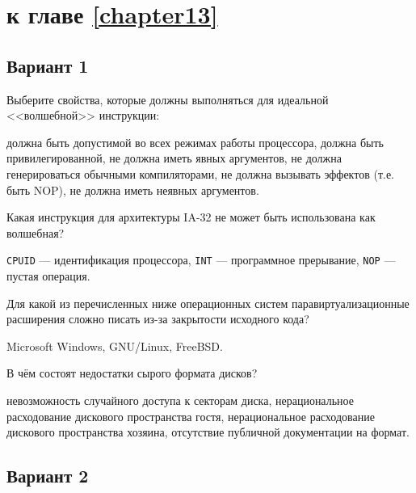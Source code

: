 \section{\Questions к главе \ref{chapter13}} %

\subsection*{Вариант 1}

\begin{questions}

\question[3] Выберите свойства, которые должны выполняться для идеальной <<волшебной>> инструкции:
\begin{choices}
    \correctchoice должна быть допустимой во всех режимах работы процессора,
    \choice должна быть привилегированной,
    \choice не должна иметь явных аргументов,
    \correctchoice не должна генерироваться обычными компиляторами,
    \correctchoice не должна вызывать эффектов (т.е. быть NOP),
    \choice не должна иметь неявных аргументов.
\end{choices}

\question[3] Какая инструкция для архитектуры IA-32 не может быть использована как волшебная?
\begin{choices}
\choice \texttt{CPUID} --- идентификация процессора,
\correctchoice \texttt{INT} --- программное прерывание,
\choice \texttt{NOP} --- пустая операция.
\end{choices}

\question[3] Для какой из перечисленных ниже операционных систем паравиртуализационные расширения сложно писать из-за закрытости исходного кода?
\begin{choices}
\correctchoice Microsoft Windows,
\choice GNU/Linux,
\choice FreeBSD.
\end{choices}

\question[3] В чём состоят недостатки сырого формата дисков?
\begin{choices}
\choice невозможность случайного доступа к секторам диска,
\choice нерациональное расходование дискового пространства гостя,
\correctchoice нерациональное расходование дискового пространства хозяина,
\choice отсутствие публичной документации на формат.
\end{choices}

\end{questions}

\subsection*{Вариант 2}

